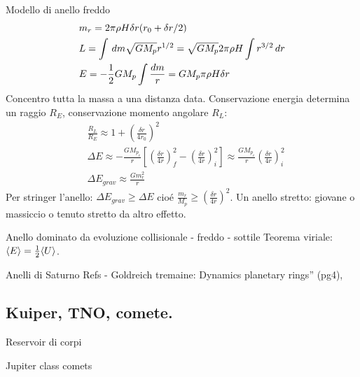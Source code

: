 \begin{frame}{Modello di anello freddo}
\begin{align*}
&m_r=2\pi\rho H\delta r(r_0+\delta r/2)\\
&L=\int\,dm\sqrt{GM_p}r^{1/2}=\sqrt{GM_p}2\pi\rho H\int r^{3/2}\,dr\\
&E=-\frac{1}{2}GM_p\int \frac{dm}{r}=GM_p\pi\rho H \delta r
\end{align*}
Concentro tutta la massa a una distanza data. Conservazione energia determina un raggio $R_E$, conservazione momento angolare $R_L$:
\begin{align*}
&\frac{R_L}{R_E}\approx1+(\frac{\delta r}{4r_0})^2\\
&\Delta E\approx -\frac{GM_p_r}{r}[(\frac{\delta r}{4r})^2_f-(\frac{\delta r}{4r})^2_i]\approx\frac{GM_p_r}{r}(\frac{\delta r}{4r})^2_i\\
&\Delta E_{grav}\approx\frac{Gm_r^2}{r}
\end{align*}
Per stringer l'anello: $\Delta E_{grav}\geq\Delta E$ cio\'e $\frac{m_r}{M_p}\geq(\frac{\delta r}{4r})^2$.
Un anello stretto: giovane o massiccio o tenuto stretto da altro effetto.
\end{frame}

\begin{wordonframe}{Anello dominato da evoluzione collisionale - freddo - sottile}
Teorema viriale: $\langle E \rangle=\frac{1}{2}\langle U \rangle$.
\end{wordonframe}

\begin{frame}{Anelli di Saturno}
Refs - Goldreich tremaine: Dynamics planetary rings'' (pg4),  
\end{frame}

\subsection{Kuiper, TNO, comete.}

\begin{frame}{Reservoir di corpi}

\end{frame}

\begin{wordonframe}{Jupiter class comets}

\end{wordonframe}

